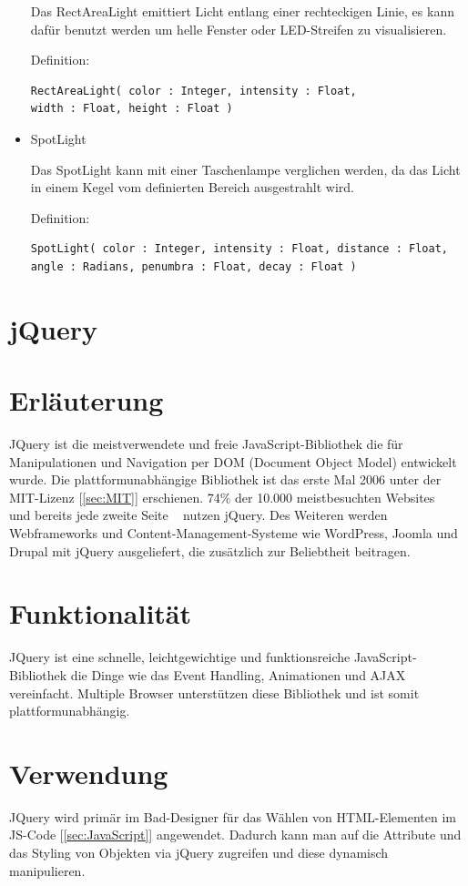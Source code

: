 \begin{itemize}
Das RectAreaLight emittiert Licht entlang einer rechteckigen Linie, es kann dafür benutzt werden um helle Fenster oder LED-Streifen zu visualisieren.

Definition:
\begin{verbatim}
RectAreaLight( color : Integer, intensity : Float, 
width : Float, height : Float )
\end{verbatim}
  \item SpotLight

Das SpotLight kann mit einer Taschenlampe verglichen werden, da das Licht in einem Kegel vom definierten Bereich ausgestrahlt wird. 

Definition:
\begin{verbatim}
SpotLight( color : Integer, intensity : Float, distance : Float, 
angle : Radians, penumbra : Float, decay : Float )
\end{verbatim}
\end{itemize}

\newpage
\clearpage
\section{jQuery}
\cite{jQuery}
\section*{Erläuterung}
JQuery ist die meistverwendete und freie JavaScript-Bibliothek die für Manipulationen und Navigation per DOM (Document Object Model) entwickelt wurde. Die plattformunabhängige Bibliothek ist das erste Mal 2006 unter der MIT-Lizenz [\ref{sec:MIT}] erschienen. 74\% der 10.000 meistbesuchten Websites ~\cite{jQuery_Usage01} und bereits jede zweite Seite ~\cite{jQuery_Usage02}  nutzen jQuery. Des Weiteren werden Webframeworks und Content-Management-Systeme wie WordPress, Joomla und Drupal mit jQuery ausgeliefert, die zusätzlich zur Beliebtheit beitragen. 

\section*{Funktionalität}
JQuery ist eine schnelle, leichtgewichtige und funktionsreiche JavaScript-Bibliothek die Dinge wie das Event Handling, Animationen und AJAX vereinfacht. Multiple Browser unterstützen diese Bibliothek und ist somit plattformunabhängig.

\section*{Verwendung}
JQuery wird primär im Bad-Designer für das Wählen von HTML-Elementen im JS-Code [\ref{sec:JavaScript}] angewendet. Dadurch kann man auf die Attribute und das Styling von Objekten via jQuery zugreifen und diese dynamisch manipulieren. 

